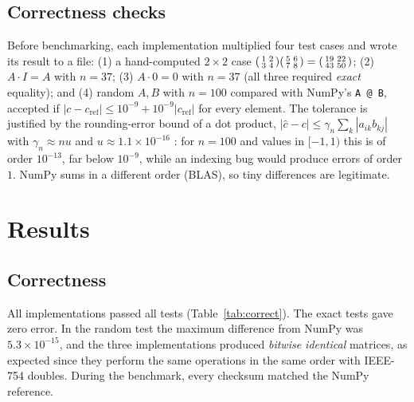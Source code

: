 \documentclass[11pt,a4paper]{article}
\begin{document}
\subsection{Correctness checks}
Before benchmarking, each implementation multiplied four test cases and wrote its result
to a file:
(1) a hand-computed $2\times 2$ case $\begin{psmallmatrix}1&2\\3&4\end{psmallmatrix}
\begin{psmallmatrix}5&6\\7&8\end{psmallmatrix}=\begin{psmallmatrix}19&22\\43&50\end{psmallmatrix}$;
(2) $A \cdot I = A$ with $n = 37$; (3) $A \cdot 0 = 0$ with $n = 37$ (all three required
\emph{exact} equality); and (4) random $A, B$ with $n = 100$ compared with NumPy's
\texttt{A @ B}, accepted if $|c - c_{\text{ref}}| \le 10^{-9} + 10^{-9}|c_{\text{ref}}|$
for every element. The tolerance is justified by the rounding-error bound of a dot
product, $|\hat{c}-c| \le \gamma_n \sum_k |a_{ik} b_{kj}|$ with
$\gamma_n \approx n u$ and $u \approx 1.1\times 10^{-16}$ \cite{higham}: for $n=100$
and values in $[-1,1)$ this is of order $10^{-13}$, far below $10^{-9}$, while an
indexing bug would produce errors of order $1$. NumPy sums in a different order (BLAS),
so tiny differences are legitimate.

\needspace{0.3\textheight}
\section{Results}

\subsection{Correctness}
All implementations passed all tests (Table~\ref{tab:correct}). The exact tests gave
zero error. In the random test the maximum difference from NumPy was
$5.3\times 10^{-15}$, and the three implementations produced \emph{bitwise identical}
matrices, as expected since they perform the same operations in the same order with
IEEE-754 doubles. During the benchmark, every checksum matched the NumPy reference.
\end{document}
